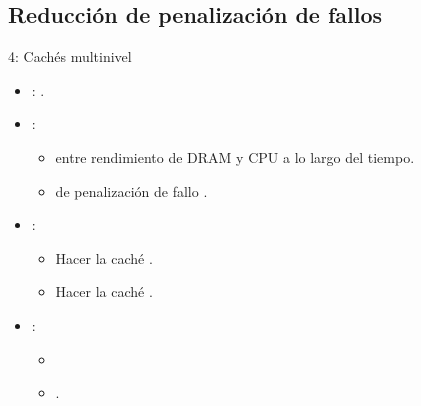 \subsection{Reducción de penalización de fallos}

\begin{frame}[t]{4: Cachés multinivel}
\begin{itemize}
  \item {}: .

  \item {}:
    \begin{itemize} 
      \item {} entre rendimiento de DRAM y CPU a lo largo del tiempo.
      \item {} de penalización de fallo .
    \end{itemize}

  \item {}:
    \begin{itemize} 
      \item Hacer la caché .
      \item Hacer la caché .
    \end{itemize}

  \item {}:
    \begin{itemize}
      \item {}
      \item {}.
    \end{itemize}
\end{itemize}
\end{frame}

